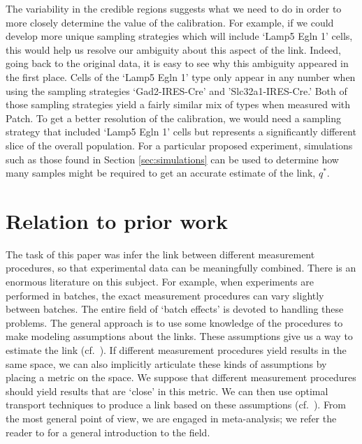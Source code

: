 The variability in the credible regions suggests what we need to do in order to more closely determine the value of the calibration.  For example, if we could develop more unique sampling strategies which will include `Lamp5 Egln 1' cells, this would help us resolve our ambiguity about this aspect of the link.  Indeed, going back to the original data, it is easy to see why this ambiguity appeared in the first place.  Cells of the `Lamp5 Egln 1' type only appear in any number when using the sampling strategies `Gad2-IRES-Cre' and 'Slc32a1-IRES-Cre.'  Both of those sampling strategies yield a fairly similar mix of types when measured with Patch.  To get a better resolution of the calibration, we would need a sampling strategy that included `Lamp5 Egln 1' cells but represents a significantly different slice of the overall population.  For a particular proposed experiment, simulations such as those found in Section \ref{sec:simulations} can be used to determine how many samples might be required to get an accurate estimate of the link, $q^*$.



\section{Relation to prior work}

The task of this paper was infer the link between different measurement procedures, so that experimental data can be meaningfully combined.  There is an enormous literature on this subject.  For example, when experiments are performed in batches, the exact measurement procedures can vary slightly between batches.  The entire field of `batch effects' is devoted to handling these problems.  The general approach is to use some knowledge of the procedures to make modeling assumptions about the links.  These assumptions give us a way to estimate the link (cf.\ \cite{johnson2007adjusting}).  If different measurement procedures yield results in the same space, we can also implicitly articulate these kinds of assumptions by placing a metric on the space.  We suppose that different measurement procedures should yield results that are `close' in this metric.  We can then use optimal transport techniques to produce a link based on these assumptions (cf.\ \cite{tabak2018explanation}).  From the most general point of view, we are engaged in meta-analysis; we refer the reader to \cite{borenstein2011introduction} for a general introduction to the field.  

